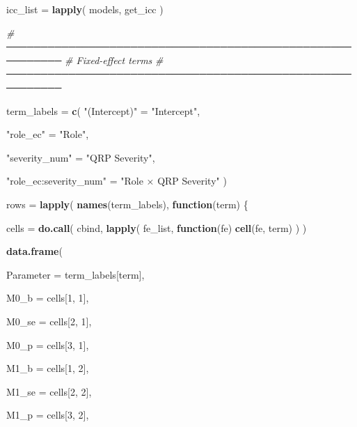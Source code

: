 \documentclass[
]{article}
\newenvironment{Shaded}{\begin{snugshade}}{\end{snugshade}}
\newcommand{\AttributeTok}[1]{\textcolor[rgb]{0.13,0.29,0.53}{#1}}
\newcommand{\CommentTok}[1]{\textcolor[rgb]{0.56,0.35,0.01}{\textit{#1}}}
\newcommand{\ControlFlowTok}[1]{\textcolor[rgb]{0.13,0.29,0.53}{\textbf{#1}}}
\newcommand{\DecValTok}[1]{\textcolor[rgb]{0.00,0.00,0.81}{#1}}
\newcommand{\FunctionTok}[1]{\textcolor[rgb]{0.13,0.29,0.53}{\textbf{#1}}}
\newcommand{\NormalTok}[1]{#1}
\newcommand{\OtherTok}[1]{\textcolor[rgb]{0.56,0.35,0.01}{#1}}
\newcommand{\StringTok}[1]{\textcolor[rgb]{0.31,0.60,0.02}{#1}}
\begin{document}
\begin{Shaded}
\begin{Highlighting}[]
\NormalTok{  icc\_list }\OtherTok{=} \FunctionTok{lapply}\NormalTok{(}
\NormalTok{    models,}
\NormalTok{    get\_icc}
\NormalTok{  )}


  \CommentTok{\# ──────────────────────────────────────────────────────────}
  \CommentTok{\# Fixed{-}effect terms}
  \CommentTok{\# ──────────────────────────────────────────────────────────}

\NormalTok{  term\_labels }\OtherTok{=} \FunctionTok{c}\NormalTok{(}
    \StringTok{"(Intercept)"} \OtherTok{=}
      \StringTok{"Intercept"}\NormalTok{,}

    \StringTok{"role\_ec"} \OtherTok{=}
      \StringTok{"Role"}\NormalTok{,}

    \StringTok{"severity\_num"} \OtherTok{=}
      \StringTok{"QRP Severity"}\NormalTok{,}

    \StringTok{"role\_ec:severity\_num"} \OtherTok{=}
      \StringTok{"Role × QRP Severity"}
\NormalTok{  )}


\NormalTok{  rows }\OtherTok{=} \FunctionTok{lapply}\NormalTok{(}
    \FunctionTok{names}\NormalTok{(term\_labels),}
    \ControlFlowTok{function}\NormalTok{(term) \{}

\NormalTok{      cells }\OtherTok{=}
        \FunctionTok{do.call}\NormalTok{(}
\NormalTok{          cbind,}
          \FunctionTok{lapply}\NormalTok{(}
\NormalTok{            fe\_list,}
            \ControlFlowTok{function}\NormalTok{(fe) }\FunctionTok{cell}\NormalTok{(fe, term)}
\NormalTok{          )}
\NormalTok{        )}

      \FunctionTok{data.frame}\NormalTok{(}

        \AttributeTok{Parameter =}
\NormalTok{          term\_labels[term],}

        \AttributeTok{M0\_b =}
\NormalTok{          cells[}\DecValTok{1}\NormalTok{, }\DecValTok{1}\NormalTok{],}

        \AttributeTok{M0\_se =}
\NormalTok{          cells[}\DecValTok{2}\NormalTok{, }\DecValTok{1}\NormalTok{],}

        \AttributeTok{M0\_p =}
\NormalTok{          cells[}\DecValTok{3}\NormalTok{, }\DecValTok{1}\NormalTok{],}

        \AttributeTok{M1\_b =}
\NormalTok{          cells[}\DecValTok{1}\NormalTok{, }\DecValTok{2}\NormalTok{],}

        \AttributeTok{M1\_se =}
\NormalTok{          cells[}\DecValTok{2}\NormalTok{, }\DecValTok{2}\NormalTok{],}

        \AttributeTok{M1\_p =}
\NormalTok{          cells[}\DecValTok{3}\NormalTok{, }\DecValTok{2}\NormalTok{],}


\end{Highlighting}
\end{Shaded}
\end{document}
